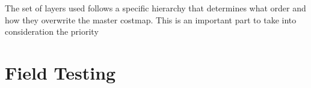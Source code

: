 The set of layers used follows a specific hierarchy that determines what order and how they overwrite the master costmap. This is an important part to take into consideration the priority


\section{Field Testing}



